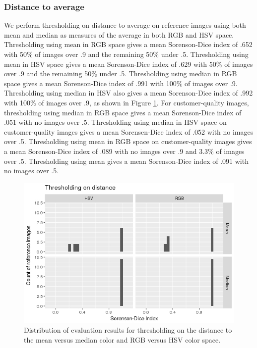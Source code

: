 \documentclass{article}
\begin{document}
\subsubsection{Distance to average}

We perform thresholding on distance to average on reference images using both mean and median as measures of the average in both RGB and HSV space. Thresholding using mean in RGB space gives a mean Sorenson-Dice index of .652 with 50\% of images over .9 and the remaining 50\% under .5. Thresholding using mean in HSV space gives a mean Sorenson-Dice index of .629 with 50\% of images over .9 and the remaining 50\% under .5. Thresholding using median in RGB space gives a mean Sorenson-Dice index of .991 with 100\% of images over .9. Thresholding using median in HSV also gives a mean Sorenson-Dice index of .992 with 100\% of images over .9, as shown in Figure \ref{fig:dist-thresh}. For customer-quality images, thresholding using median in RGB space gives a mean Sorenson-Dice index of .051 with no images over .5. Thresholding using median in HSV space on customer-quality images gives a mean Sorensen-Dice index of .052 with no images over .5. Thresholding using mean in RGB space on customer-quality images gives a mean Sorenson-Dice index of .089 with no images over .9 and 3.3\% of images over .5. Thresholding using mean gives a mean Sorenson-Dice index of .091 with no images over .5.

\begin{figure}
    \includegraphics[width=\linewidth]{images/dist_gray.jpeg}
    \caption{Distribution of evaluation results for thresholding on the distance to the mean versus median color and RGB versus HSV color space.}
    \label{fig:dist-thresh}
\end{figure}
\end{document}
